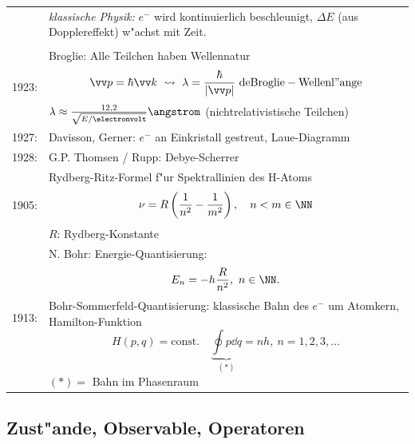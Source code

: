 \documentclass[a4paper]{scrartcl}
\begin{document}
\begin{tabular}{l p{400pt}}
& \emph{klassische Physik:} $e^-$ wird kontinuierlich beschleunigt, $\Delta E$ (aus Dopplereffekt) w"achst mit Zeit. \\
\\
1923: & Broglie: Alle Teilchen haben Wellennatur
$$\vv p = \hbar \vv k \ \leadsto \  \lambda = \frac{\hbar}{ \vert \vv p \vert } \ \mathrm{ deBroglie-Wellenl"ange}$$
$\lambda \approx \frac{12,2}{\sqrt{ E/ \electronvolt}} \angstrom$ (nichtrelativistische Teilchen)
\\
1927: & Davisson, Gerner: $e^-$ an Einkristall gestreut, Laue-Diagramm \\
1928: & G.P. Thomsen / Rupp: Debye-Scherrer \\
1905: & Rydberg-Ritz-Formel f"ur Spektrallinien des H-Atoms
$$\nu = R\left( \frac1{n^2} - \frac1{m^2} \right), \quad n<m \in \NN$$
$R$: Rydberg-Konstante \\
1913: & N. Bohr: Energie-Quantisierung: $$E_n = - h \frac{R}{n^2}, \ n \in \NN.$$
Bohr-Sommerfeld-Quantisierung: klassische Bahn des $e^-$ um Atomkern, Hamilton-Funktion 
$$H(p,q) = \mathrm{const.} \quad \underbrace{\oint p \dd q}_{(*)} = nh, \ n = 1,2,3, \ldots$$
$(*) = $ Bahn im Phasenraum
\end{tabular}

\subsection{Zust"ande, Observable, Operatoren}
\end{document}
